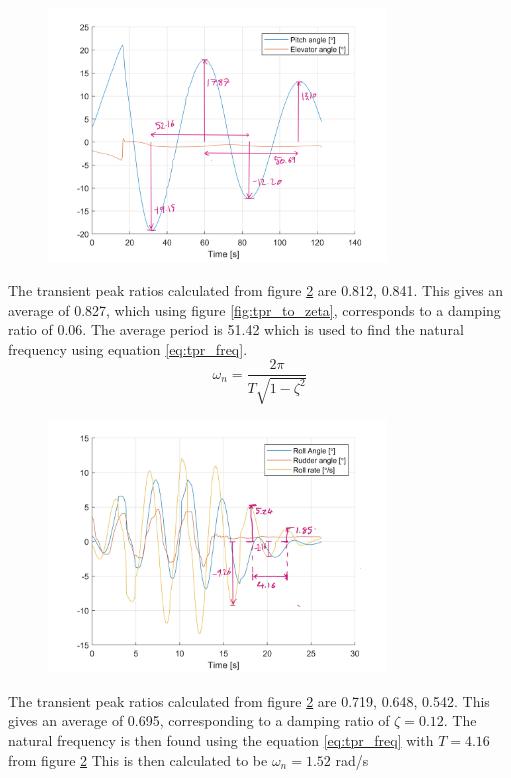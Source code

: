 \documentclass{article}
\begin{document}
\begin{figure}[H]
  \centering
  \includegraphics[width=0.8\textwidth]{figures/anPhugoid.png}
  \caption{}
  \label{fig:phugoid}
\end{figure}

The transient peak ratios calculated from figure \ref{fig:dutchroll} are 0.812, 0.841.
This gives an average of 0.827, which using figure \ref{fig:tpr_to_zeta}, corresponds to a damping ratio of 0.06.
The average period is 51.42 which is used to find the natural frequency using equation \ref{eq:tpr_freq}.
\begin{equation}
  \omega_n = \frac{2 \pi}{T\sqrt{1 - \zeta^2}}
  \label{eq:tpr_freq}
\end{equation}

\begin{figure}[H]
  \centering
  \includegraphics[width=0.8\textwidth]{figures/anDutchRoll.jpg}
  \caption{}
  \label{fig:dutchroll}
\end{figure}

The transient peak ratios calculated from figure \ref{fig:dutchroll} are 0.719, 0.648, 0.542.
This gives an average of 0.695, corresponding to a damping ratio of $\zeta = 0.12$.
The natural frequency is then found using the equation \ref{eq:tpr_freq} with $T=4.16$ from figure \ref{fig:dutchroll}
This is then calculated to be $\omega_n = 1.52$ rad/s
\end{document}
